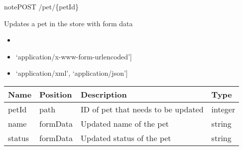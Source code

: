 \documentclass[letterpaper,10pt,english]{sphinxmanual}
\begin{document}
\begin{sphinxadmonition}{note}{POST /pet/\{petId\}}

Updates a pet in the store with form data\begin{itemize}
\item {} 

\item {} 
\sphinxstylestrong{Consumes: 
}{[}‘application/x-www-form-urlencoded’{]}

\item {} 
\sphinxstylestrong{Produces: 
}{[}‘application/xml’, ‘application/json’{]}

\end{itemize}




\begin{savenotes}\sphinxattablestart
\centering
\begin{tabulary}{\linewidth}[t]{|T|T|T|T|}
\hline
\sphinxstyletheadfamily 
Name
&\sphinxstyletheadfamily 
Position
&\sphinxstyletheadfamily 
Description
&\sphinxstyletheadfamily 
Type
\\
\hline
petId
&
path
&
ID of pet that needs to be updated
&
integer
\\
\hline
name
&
formData
&
Updated name of the pet
&
string
\\
\hline
status
&
formData
&
Updated status of the pet
&
string
\\
\hline
\end{tabulary}
\par
\sphinxattableend\end{savenotes}


\end{sphinxadmonition}
\end{document}
